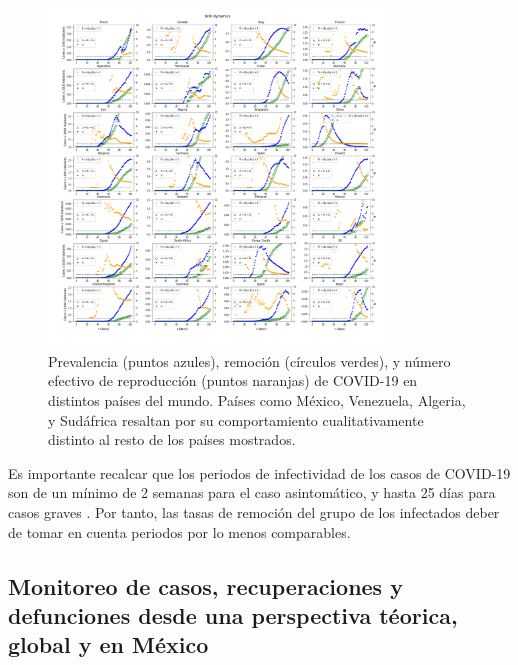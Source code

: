 \documentclass[8pt]{article}
\begin{document}
\begin{figure}[th!] \centering
\includegraphics[width=0.8\textwidth]{figures/dam_COVID19_JHU_dynamicsDataSIR_globalSample}
\caption{Prevalencia (puntos azules), remoción (círculos verdes), y número efectivo de reproducción (puntos naranjas) de COVID-19 en distintos países del mundo. Países como México, Venezuela, Algeria, y Sudáfrica resaltan por su comportamiento cualitativamente distinto al resto de los países mostrados.}\label{fig:dataNIW}

\end{figure}

Es importante recalcar que los periodos de infectividad de los casos de COVID-19 son de un mínimo de 2 semanas para el caso asintomático, y hasta 25 días para casos graves \citep{liu2020viral,zhou2020clinical}. Por tanto, las tasas de remoción del grupo de los infectados deber de tomar en cuenta periodos por lo menos comparables. 



\subsection*{Monitoreo de casos, recuperaciones y defunciones desde una perspectiva téorica, global y en México} 
\end{document}
